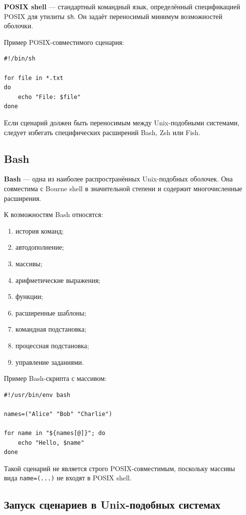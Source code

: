 \documentclass[12pt,a4paper]{article}
\begin{document}
\textbf{POSIX shell} --- стандартный командный язык, определённый спецификацией POSIX для утилиты \texttt{sh}. Он задаёт переносимый минимум возможностей оболочки.

Пример POSIX-совместимого сценария:

\begin{lstlisting}
#!/bin/sh

for file in *.txt
do
    echo "File: $file"
done
\end{lstlisting}

Если сценарий должен быть переносимым между Unix-подобными системами, следует избегать специфических расширений Bash, Zsh или Fish.

\subsection{Bash}

\textbf{Bash} --- одна из наиболее распространённых Unix-подобных оболочек. Она совместима с Bourne shell в значительной степени и содержит многочисленные расширения.

К возможностям Bash относятся:
\begin{enumerate}
    \item история команд;
    \item автодополнение;
    \item массивы;
    \item арифметические выражения;
    \item функции;
    \item расширенные шаблоны;
    \item командная подстановка;
    \item процессная подстановка;
    \item управление заданиями.
\end{enumerate}

Пример Bash-скрипта с массивом:

\begin{lstlisting}
#!/usr/bin/env bash

names=("Alice" "Bob" "Charlie")

for name in "${names[@]}"; do
    echo "Hello, $name"
done
\end{lstlisting}

Такой сценарий не является строго POSIX-совместимым, поскольку массивы вида \texttt{name=(...)} не входят в POSIX shell.

\subsection{Запуск сценариев в Unix-подобных системах}
\end{document}
